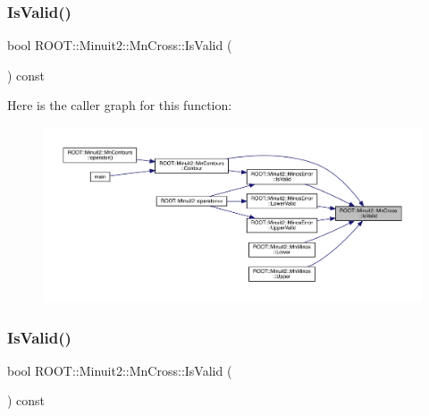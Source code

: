 \mbox{\label{classROOT_1_1Minuit2_1_1MnCross_a9cee17151ec7e078fc6efbfa32120a1a}} 
\subsubsection{\texorpdfstring{IsValid()}{IsValid()}\hspace{0.1cm}{\footnotesize\ttfamily [2/3]}}
{\footnotesize\ttfamily bool R\+O\+O\+T\+::\+Minuit2\+::\+Mn\+Cross\+::\+Is\+Valid (\begin{DoxyParamCaption}{ }\end{DoxyParamCaption}) const\hspace{0.3cm}{\ttfamily [inline]}}

Here is the caller graph for this function\+:
\nopagebreak
\begin{figure}[H]
\begin{center}
\leavevmode
\includegraphics[width=350pt]{d3/db2/classROOT_1_1Minuit2_1_1MnCross_a9cee17151ec7e078fc6efbfa32120a1a_icgraph}
\end{center}
\end{figure}
\mbox{\label{classROOT_1_1Minuit2_1_1MnCross_a9cee17151ec7e078fc6efbfa32120a1a}} 
\subsubsection{\texorpdfstring{IsValid()}{IsValid()}\hspace{0.1cm}{\footnotesize\ttfamily [3/3]}}
{\footnotesize\ttfamily bool R\+O\+O\+T\+::\+Minuit2\+::\+Mn\+Cross\+::\+Is\+Valid (\begin{DoxyParamCaption}{ }\end{DoxyParamCaption}) const\hspace{0.3cm}{\ttfamily [inline]}}

